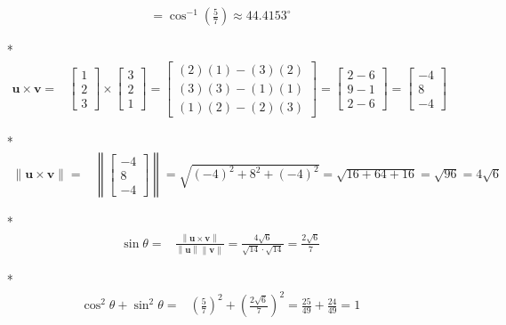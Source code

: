 \documentclass{article}
\begin{document}
\begin{itemize}
\begin{align*}
= \cos^{-1}\left(\frac{5}{7}\right)   
\approx 44.4153^\circ
\end{align*}  
\item[*] \begin{align*}
\mathbf{u} \times \mathbf{v} = & \begin{bmatrix} 1 \\ 2 \\ 3 \end{bmatrix} \times \begin{bmatrix} 3 \\ 2 \\ 1 \end{bmatrix}  
= \begin{bmatrix} (2)(1) - (3)(2) \\ (3)(3) - (1)(1) \\ (1)(2) - (2)(3) \end{bmatrix} 
= \begin{bmatrix} 2 - 6 \\ 9 - 1 \\ 2 - 6 \end{bmatrix} 
= \begin{bmatrix} -4 \\ 8 \\ -4 \end{bmatrix}
\end{align*}
\item[*] \begin{align*}
\left\|\mathbf{u} \times \mathbf{v}\right\| = & \left\|\begin{bmatrix} -4 \\ 8 \\ -4 \end{bmatrix}\right\|  
= \sqrt{(-4)^2 + 8^2 + (-4)^2} 
= \sqrt{16 + 64 + 16} 
= \sqrt{96} 
= 4\sqrt{6}
\end{align*}
\item[*] \begin{align*}
\sin\theta = & \frac{\left\|\mathbf{u} \times \mathbf{v}\right\|}{\left\|\mathbf{u}\right\| \left\|\mathbf{v}\right\|} 
= \frac{4\sqrt{6}}{\sqrt{14} \cdot \sqrt{14}} 
= \frac{2\sqrt{6}}{7} 
\end{align*}
\item[*] \begin{align*}
\cos^2\theta + \sin^2\theta 
= & \left(\frac{5}{7}\right)^2 + \left(\frac{2\sqrt{6}}{7}\right)^2 
= \frac{25}{49} + \frac{24}{49} = 1
\end{align*}
\end{itemize}
\end{document}

